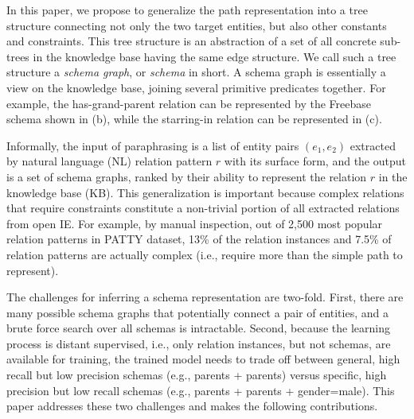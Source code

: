 In this paper, we propose to generalize the path representation
into a tree structure connecting not only the two target entities, but also
other constants and constraints. This tree structure is an abstraction of
a set of all concrete sub-trees in the knowledge base having the same edge
structure.
We call such a tree structure a {\em schema graph}, or {\em schema}
in short.
A schema graph is essentially a view on the knowledge base,
joining several primitive predicates together.
For example, the has-grand-parent relation can be represented by
the Freebase schema shown in (b), while
the starring-in relation can be represented in (c).

Informally, the input of paraphrasing is a list of entity pairs
$(e_1, e_2)$ extracted by natural language (NL) relation pattern $r$
with its surface form,
and the output is a set of schema graphs, ranked by their ability to
represent the relation $r$ in the knowledge base (KB).
This generalization is important because complex relations that
require constraints constitute a non-trivial portion of all extracted
relations from open IE.
For example, by manual inspection, out of 2,500 most popular 
relation patterns in PATTY dataset,  13\% of the relation
instances and 7.5\% of relation patterns are actually complex (i.e.,
require more than the simple path to represent).

The challenges for inferring a schema representation are two-fold.
First, there are many possible schema graphs that potentially
connect a pair of entities, and a brute force search over all schemas
is intractable.
Second, because the learning process is distant supervised, i.e.,
only relation instances, but not schemas, are available for training,
the trained model needs to trade off between general, high recall but
low precision schemas (e.g., parents + parents) versus specific, high
precision but low recall schemas (e.g., parents + parents + gender=male).
This paper addresses these two challenges and makes the following
contributions.

